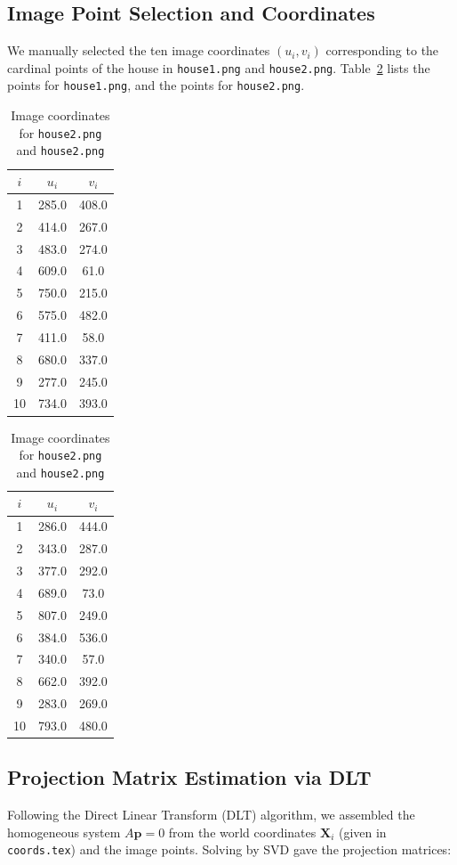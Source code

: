 \subsection{Image Point Selection and Coordinates}
We manually selected the ten image coordinates $(u_i,v_i)$ corresponding to the cardinal points of the house in \texttt{house1.png} and \texttt{house2.png}. Table~\ref{tab:imgpts2} lists the points for \texttt{house1.png}, and the points for \texttt{house2.png}.

\begin{table}[H]
  \centering
  \begin{tabular}{c|cc}
    $i$ & $u_i$ & $v_i$ \\
    \hline
    1 & 285.0 & 408.0 \\
    2 & 414.0 & 267.0 \\
    3 & 483.0 & 274.0 \\
    4 & 609.0 & 61.0  \\
    5 & 750.0 & 215.0 \\
    6 & 575.0 & 482.0 \\
    7 & 411.0 & 58.0  \\
    8 & 680.0 & 337.0 \\
    9 & 277.0 & 245.0 \\
    10 & 734.0 & 393.0\\
\end{tabular}
\hspace{2cm}
\begin{tabular}{c|cc}
    $i$ & $u_i$ & $v_i$ \\
    \hline
    1 & 286.0 & 444.0 \\
    2 & 343.0 & 287.0 \\
    3 & 377.0 & 292.0 \\
    4 & 689.0 & 73.0  \\
    5 & 807.0 & 249.0 \\
    6 & 384.0 & 536.0 \\
    7 & 340.0 & 57.0  \\
    8 & 662.0 & 392.0 \\
    9 & 283.0 & 269.0 \\
    10 & 793.0 & 480.0\\
\end{tabular}
\caption{Image coordinates for \texttt{house2.png} and \texttt{house2.png}}
\label{tab:imgpts2}
\end{table}

\subsection{Projection Matrix Estimation via DLT}
Following the Direct Linear Transform (DLT) algorithm, we assembled the homogeneous system $A\mathbf{p}=0$ from the world coordinates $\mathbf{X}_i$ (given in \texttt{coords.tex}) and the image points. Solving by SVD gave the projection matrices:


